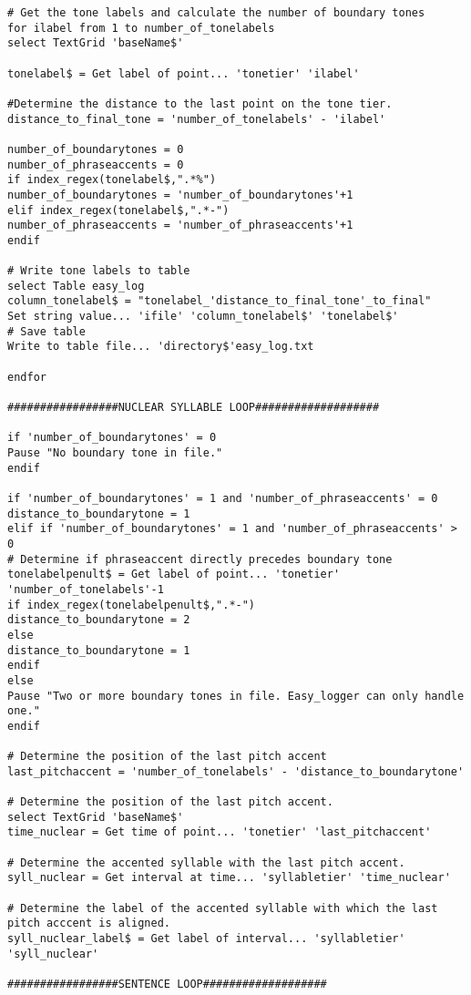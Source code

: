\begin{Verbatim}[fontsize=\tiny]
# Get the tone labels and calculate the number of boundary tones
for ilabel from 1 to number_of_tonelabels
select TextGrid 'baseName$'

tonelabel$ = Get label of point... 'tonetier' 'ilabel'

#Determine the distance to the last point on the tone tier.
distance_to_final_tone = 'number_of_tonelabels' - 'ilabel' 

number_of_boundarytones = 0
number_of_phraseaccents = 0
if index_regex(tonelabel$,".*%")
number_of_boundarytones = 'number_of_boundarytones'+1
elif index_regex(tonelabel$,".*-") 
number_of_phraseaccents = 'number_of_phraseaccents'+1
endif

# Write tone labels to table
select Table easy_log
column_tonelabel$ = "tonelabel_'distance_to_final_tone'_to_final"
Set string value... 'ifile' 'column_tonelabel$' 'tonelabel$'
# Save table
Write to table file... 'directory$'easy_log.txt

endfor

#################NUCLEAR SYLLABLE LOOP###################

if 'number_of_boundarytones' = 0
Pause "No boundary tone in file."
endif

if 'number_of_boundarytones' = 1 and 'number_of_phraseaccents' = 0
distance_to_boundarytone = 1
elif if 'number_of_boundarytones' = 1 and 'number_of_phraseaccents' > 0
# Determine if phraseaccent directly precedes boundary tone
tonelabelpenult$ = Get label of point... 'tonetier' 'number_of_tonelabels'-1
if index_regex(tonelabelpenult$,".*-")
distance_to_boundarytone = 2
else
distance_to_boundarytone = 1
endif
else
Pause "Two or more boundary tones in file. Easy_logger can only handle one."
endif

# Determine the position of the last pitch accent
last_pitchaccent = 'number_of_tonelabels' - 'distance_to_boundarytone'

# Determine the position of the last pitch accent.
select TextGrid 'baseName$'
time_nuclear = Get time of point... 'tonetier' 'last_pitchaccent'

# Determine the accented syllable with the last pitch accent.
syll_nuclear = Get interval at time... 'syllabletier' 'time_nuclear'

# Determine the label of the accented syllable with which the last pitch acccent is aligned.
syll_nuclear_label$ = Get label of interval... 'syllabletier' 'syll_nuclear'

#################SENTENCE LOOP################### 


\end{Verbatim}
